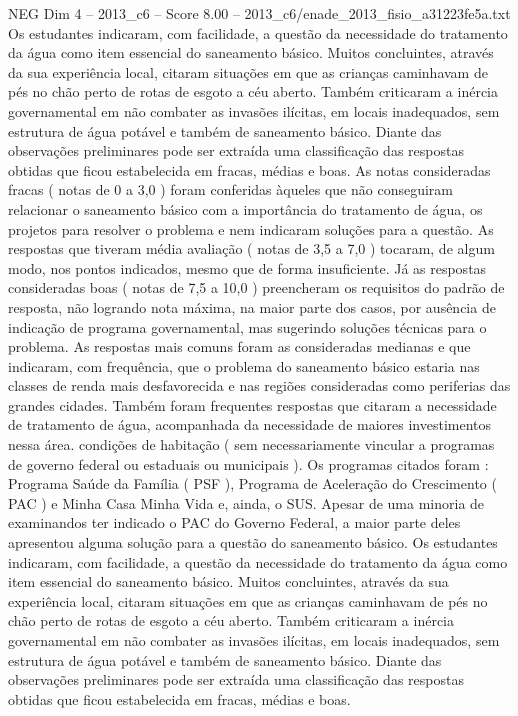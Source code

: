 \begin{textsample}{NEG Dim 4 – 2013\_c6 – Score 8.00 – 2013\_c6/enade\_2013\_fisio\_a31223fe5a.txt}
Os estudantes indicaram, com facilidade, a questão da necessidade do tratamento da água como item essencial do saneamento básico.
Muitos concluintes, através da sua experiência local, citaram situações em que as crianças caminhavam de pés no chão perto de rotas de esgoto a céu aberto.
Também criticaram a inércia governamental em não combater as invasões ilícitas, em locais inadequados, sem estrutura de água potável e também de saneamento básico.
Diante das observações preliminares pode ser extraída uma classificação das respostas obtidas que ficou estabelecida em fracas, médias e boas.
As notas consideradas fracas ( notas de 0 a 3,0 ) foram conferidas àqueles que não conseguiram relacionar o saneamento básico com a importância do tratamento de água, os projetos para resolver o problema e nem indicaram soluções para a questão.
As respostas que tiveram média avaliação ( notas de 3,5 a 7,0 ) tocaram, de algum modo, nos pontos indicados, mesmo que de forma insuficiente.
Já as respostas consideradas boas ( notas de 7,5 a 10,0 ) preencheram os requisitos do padrão de resposta, não logrando nota máxima, na maior parte dos casos, por ausência de indicação de programa governamental, mas sugerindo soluções técnicas para o problema.
As respostas mais comuns foram as consideradas medianas e que indicaram, com frequência, que o problema do saneamento básico estaria nas classes de renda mais desfavorecida e nas regiões consideradas como periferias das grandes cidades.
Também foram frequentes respostas que citaram a necessidade de tratamento de água, acompanhada da necessidade de maiores investimentos nessa área. condições de habitação ( sem necessariamente vincular a programas de governo federal ou estaduais ou municipais ).
Os programas citados foram : Programa Saúde da Família ( PSF ), Programa de Aceleração do Crescimento ( PAC ) e Minha Casa Minha Vida e, ainda, o SUS.
Apesar de uma minoria de examinandos ter indicado o PAC do Governo Federal, a maior parte deles apresentou alguma solução para a questão do saneamento básico.
Os estudantes indicaram, com facilidade, a questão da necessidade do tratamento da água como item essencial do saneamento básico.
Muitos concluintes, através da sua experiência local, citaram situações em que as crianças caminhavam de pés no chão perto de rotas de esgoto a céu aberto.
Também criticaram a inércia governamental em não combater as invasões ilícitas, em locais inadequados, sem estrutura de água potável e também de saneamento básico.
Diante das observações preliminares pode ser extraída uma classificação das respostas obtidas que ficou estabelecida em fracas, médias e boas.

\end{textsample}

